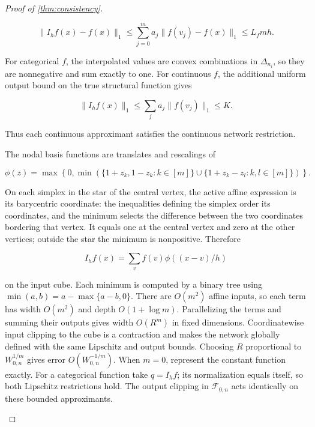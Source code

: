 \begin{proof}[Proof of \cref{thm:consistency}]
\begin{enumerate}
\[
\|I_hf(x)-f(x)\|_1\leqslant\sum_{j=0}^ma_j\|f(v_j)-f(x)\|_1\leqslant L_fmh.
\]

For categorical $f$, the interpolated values are convex combinations in $\Delta_{n_i}$, so they are nonnegative and sum exactly to one. For continuous $f$, the additional uniform output bound on the true structural function gives

\[
\|I_hf(x)\|_1\leqslant\sum_j a_j\|f(v_j)\|_1\leqslant K.
\]

Thus each continuous approximant satisfies the continuous network restriction. 

The nodal basis functions are translates and rescalings of

\[
\phi(z)=\max\left\{0,\min\left(\{1+z_k,1-z_k:k\in[m]\}\cup\{1+z_k-z_l:k,l\in[m]\}\right)\right\}.
\]

On each simplex in the star of the central vertex, the active affine expression is its barycentric coordinate: the inequalities defining the simplex order its coordinates, and the minimum selects the difference between the two coordinates bordering that vertex. It equals one at the central vertex and zero at the other vertices; outside the star the minimum is nonpositive. Therefore

\[
I_hf(x)=\sum_v f(v)\phi((x-v)/h)
\]

on the input cube. Each minimum is computed by a binary tree using $\min(a,b)=a-\max\{a-b,0\}$. There are $O(m^2)$ affine inputs, so each term has width $O(m^2)$ and depth $O(1+\log m)$. Parallelizing the terms and summing their outputs gives width $O(R^m)$ in fixed dimensions. Coordinatewise input clipping to the cube is a contraction and makes the network globally defined with the same Lipschitz and output bounds. Choosing $R$ proportional to $W_{0,n}^{1/m}$ gives error $O(W_{0,n}^{-1/m})$. When $m=0$, represent the constant function exactly. For a categorical function take $q=I_hf$; its normalization equals itself, so both Lipschitz restrictions hold. The output clipping in $\mathcal F_{0,n}$ acts identically on these bounded approximants. 


\end{enumerate}
\end{proof}
